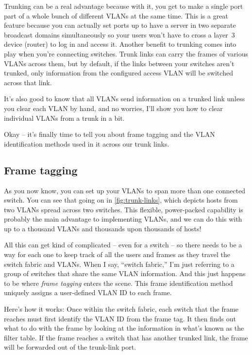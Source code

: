 \documentclass[b5paper,11pt]{memoir}
\begin{document}
Trunking can be a real advantage because with it, you get to make a
single port part of a whole bunch of different VLANs at the same time.
This is a great feature because you can actually set ports up to have a
server in two separate broadcast domains simultaneously so your users
won't have to cross a layer~3 device (router) to log in and access it.
Another benefit to trunking comes into play when you're connecting
switches. Trunk links can carry the frames of various VLANs across them,
but by default, if the links between your switches aren't trunked, only
information from the configured access VLAN will be switched across that
link.

It's also good to know that all VLANs send information on a trunked link
unless you clear each VLAN by hand, and no worries, I'll show you how to
clear individual VLANs from a trunk in a bit.

Okay -- it's finally time to tell you about frame tagging and the VLAN identification methods used in it across our trunk links.

\subsection{Frame tagging}

As you now know, you can set up your VLANs to span more than one connected switch.
You can see that going on in \cref{fig:trunk-links}, which depicts hosts from two VLANs spread across two switches.
This flexible, power-packed capability is probably the main advantage to implementing VLANs, and we can do this with up to a thousand VLANs and thousands upon thousands of hosts!

All this can get kind of complicated -- even for a switch -- so there needs to be a way for each one to keep track of all the users and frames as they travel the switch fabric and VLANs.
When I say, ``switch fabric,'' I'm just referring to a group of switches that share the same VLAN information.
And this just happens to be where \emph{frame tagging} enters the scene.
This frame identification method uniquely assigns a user-defined VLAN ID to each frame.

Here's how it works: Once within the switch fabric, each switch that the
frame reaches must first identify the VLAN ID from the frame tag. It
then finds out what to do with the frame by looking at the information
in what's known as the filter table. If the frame reaches a switch that
has another trunked link, the frame will be forwarded out of the
trunk-link port.
\end{document}
